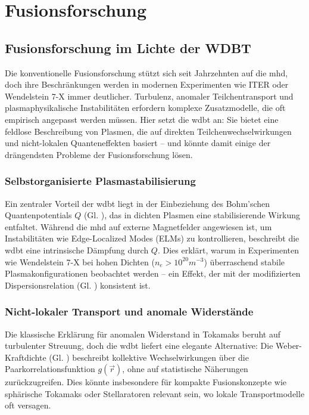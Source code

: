 \chapter{Fusionsforschung}
\section{Fusionsforschung im Lichte der WDBT}
Die konventionelle Fusionsforschung stützt sich seit Jahrzehnten auf die \gls{mhd}, doch ihre Beschränkungen werden in modernen Experimenten wie ITER oder Wendelstein 7-X immer
deutlicher. Turbulenz, anomaler Teilchentransport und plasmaphysikalische Instabilitäten erfordern komplexe Zusatzmodelle, die oft empirisch angepasst werden müssen. Hier setzt die
\gls{wdbt} an: Sie bietet eine feldlose Beschreibung von Plasmen, die auf direkten Teilchenwechselwirkungen und nicht-lokalen Quanteneffekten basiert – und könnte damit einige der
drängendsten Probleme der Fusionsforschung lösen.

\subsection{Selbstorganisierte Plasmastabilisierung}
Ein zentraler Vorteil der \gls{wdbt} liegt in der Einbeziehung des Bohm’schen Quantenpotentials $Q$ (Gl. ), das in dichten Plasmen eine stabilisierende Wirkung entfaltet.
Während die \gls{mhd} auf externe Magnetfelder angewiesen ist, um Instabilitäten wie Edge-Localized Modes (ELMs) zu kontrollieren, beschreibt die \gls{wdbt} eine intrinsische
Dämpfung durch $Q$. Dies erklärt, warum in Experimenten wie Wendelstein 7-X bei hohen Dichten ($n_e > 10^{20} m^{-3}$) überraschend stabile Plasmakonfigurationen beobachtet
werden – ein Effekt, der mit der modifizierten Dispersionsrelation (Gl. ) konsistent ist.

\subsection{Nicht-lokaler Transport und anomale Widerstände}
Die klassische Erklärung für anomalen Widerstand in Tokamaks beruht auf turbulenter Streuung, doch die \gls{wdbt} liefert eine elegante Alternative: Die Weber-Kraftdichte (Gl. )
beschreibt kollektive Wechselwirkungen über die Paarkorrelationsfunktion $g(\vec{r})$, ohne auf statistische Näherungen zurückzugreifen. Dies könnte insbesondere für kompakte
Fusionskonzepte wie sphärische Tokamaks oder Stellaratoren relevant sein, wo lokale Transportmodelle oft versagen.

